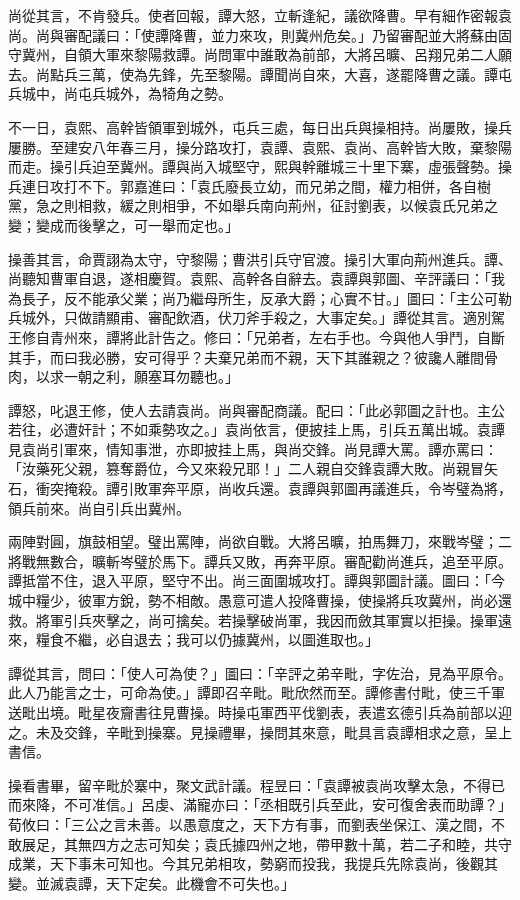 尚從其言，不肯發兵。使者回報，譚大怒，立斬逢紀，議欲降曹。早有細作密報袁尚。尚與審配議曰：「使譚降曹，並力來攻，則冀州危矣。」乃留審配並大將蘇由固守冀州，自領大軍來黎陽救譚。尚問軍中誰敢為前部，大將呂曠、呂翔兄弟二人願去。尚點兵三萬，使為先鋒，先至黎陽。譚聞尚自來，大喜，遂罷降曹之議。譚屯兵城中，尚屯兵城外，為犄角之勢。

不一日，袁熙、高幹皆領軍到城外，屯兵三處，每日出兵與操相持。尚屢敗，操兵屢勝。至建安八年春三月，操分路攻打，袁譚、袁熙、袁尚、高幹皆大敗，棄黎陽而走。操引兵迫至冀州。譚與尚入城堅守，熙與幹離城三十里下寨，虛張聲勢。操兵連日攻打不下。郭嘉進曰：「袁氏廢長立幼，而兄弟之間，權力相併，各自樹黨，急之則相救，緩之則相爭，不如舉兵南向荊州，征討劉表，以候袁氏兄弟之變；變成而後擊之，可一舉而定也。」

操善其言，命賈詡為太守，守黎陽；曹洪引兵守官渡。操引大軍向荊州進兵。譚、尚聽知曹軍自退，遂相慶賀。袁熙、高幹各自辭去。袁譚與郭圖、辛評議曰：「我為長子，反不能承父業；尚乃繼母所生，反承大爵；心實不甘。」圖曰：「主公可勒兵城外，只做請顯甫、審配飲酒，伏刀斧手殺之，大事定矣。」譚從其言。適別駕王修自青州來，譚將此計告之。修曰：「兄弟者，左右手也。今與他人爭鬥，自斷其手，而曰我必勝，安可得乎？夫棄兄弟而不親，天下其誰親之？彼讒人離間骨肉，以求一朝之利，願塞耳勿聽也。」

譚怒，叱退王修，使人去請袁尚。尚與審配商議。配曰：「此必郭圖之計也。主公若往，必遭奸計；不如乘勢攻之。」袁尚依言，便披挂上馬，引兵五萬出城。袁譚見袁尚引軍來，情知事泄，亦即披挂上馬，與尚交鋒。尚見譚大罵。譚亦罵曰：「汝藥死父親，篡奪爵位，今又來殺兄耶！」二人親自交鋒袁譚大敗。尚親冒矢石，衝突掩殺。譚引敗軍奔平原，尚收兵還。袁譚與郭圖再議進兵，令岑璧為將，領兵前來。尚自引兵出冀州。

兩陣對圓，旗鼓相望。璧出罵陣，尚欲自戰。大將呂曠，拍馬舞刀，來戰岑璧；二將戰無數合，曠斬岑璧於馬下。譚兵又敗，再奔平原。審配勸尚進兵，追至平原。譚抵當不住，退入平原，堅守不出。尚三面圍城攻打。譚與郭圖計議。圖曰：「今城中糧少，彼軍方銳，勢不相敵。愚意可遣人投降曹操，使操將兵攻冀州，尚必還救。將軍引兵夾擊之，尚可擒矣。若操擊破尚軍，我因而斂其軍實以拒操。操軍遠來，糧食不繼，必自退去；我可以仍據冀州，以圖進取也。」

譚從其言，問曰：「使人可為使？」圖曰：「辛評之弟辛毗，字佐治，見為平原令。此人乃能言之士，可命為使。」譚即召辛毗。毗欣然而至。譚修書付毗，使三千軍送毗出境。毗星夜齎書往見曹操。時操屯軍西平伐劉表，表遣玄德引兵為前部以迎之。未及交鋒，辛毗到操寨。見操禮畢，操問其來意，毗具言袁譚相求之意，呈上書信。

操看書畢，留辛毗於寨中，聚文武計議。程昱曰：「袁譚被袁尚攻擊太急，不得已而來降，不可准信。」呂虔、滿寵亦曰：「丞相既引兵至此，安可復舍表而助譚？」荀攸曰：「三公之言未善。以愚意度之，天下方有事，而劉表坐保江、漢之間，不敢展足，其無四方之志可知矣；袁氏據四州之地，帶甲數十萬，若二子和睦，共守成業，天下事未可知也。今其兄弟相攻，勢窮而投我，我提兵先除袁尚，後觀其變。並滅袁譚，天下定矣。此機會不可失也。」

